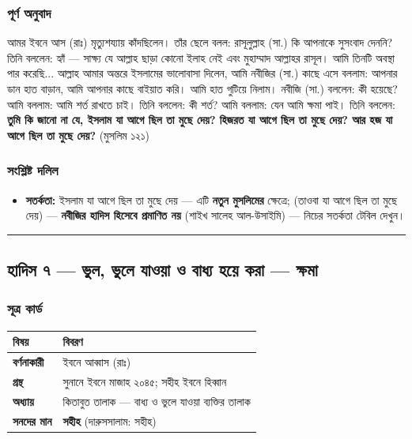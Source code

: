 \subsubsection*{পূর্ণ অনুবাদ}

আমর ইবনে আস (রাঃ) মৃত্যুশয্যায় কাঁদছিলেন। তাঁর ছেলে বলল: রাসূলুল্লাহ (সা.) কি আপনাকে সুসংবাদ দেননি? তিনি বললেন: হ্যাঁ — সাক্ষ্য যে আল্লাহ ছাড়া কোনো ইলাহ নেই এবং মুহাম্মাদ আল্লাহর রাসূল। আমি তিনটি অবস্থা পার করেছি... আল্লাহ আমার অন্তরে ইসলামের ভালোবাসা দিলেন, আমি নবীজির (সা.) কাছে এসে বললাম: আপনার ডান হাত বাড়ান, আমি আপনার কাছে বাইয়াত করি। আমি হাত গুটিয়ে নিলাম। নবীজি (সা.) বললেন: কী হয়েছে? আমি বললাম: আমি শর্ত রাখতে চাই। তিনি বললেন: কী শর্ত? আমি বললাম: যেন আমি ক্ষমা পাই। তিনি বললেন: \textbf{তুমি কি জানো না যে, ইসলাম যা আগে ছিল তা মুছে দেয়? হিজরত যা আগে ছিল তা মুছে দেয়? আর হজ যা আগে ছিল তা মুছে দেয়?} (মুসলিম ১২১)

\subsubsection*{সংশ্লিষ্ট দলিল}

\begin{itemize}
\item \textbf{সতর্কতা:} ইসলাম যা আগে ছিল তা মুছে দেয় — এটি \textbf{নতুন মুসলিমের} ক্ষেত্রে;     (তাওবা যা আগে ছিল তা মুছে দেয়) — \textbf{নবীজির হাদিস হিসেবে প্রমাণিত নয়} (শাইখ সালেহ আল-উসাইমি) — নিচের সতর্কতা টেবিল দেখুন।
\end{itemize}
\medskip\hrule\medskip

\subsection*{হাদিস ৭ — ভুল, ভুলে যাওয়া ও বাধ্য হয়ে করা — ক্ষমা}

\subsubsection*{সূত্র কার্ড}

\begin{table}[h]\centering\small
\begin{tabular}{ll}
বিষয় & বিবরণ \\
\hline
\textbf{বর্ণনাকারী} & ইবনে আব্বাস (রাঃ) \\
\textbf{গ্রন্থ} & সুনানে ইবনে মাজাহ ২০৪৫; সহীহ ইবনে হিব্বান \\
\textbf{অধ্যায়} & কিতাবুত তালাক — \lat{“}বাধ্য ও ভুলে যাওয়া ব্যক্তির তালাক\lat{”} \\
\textbf{সনদের মান} & \textbf{সহীহ} (দারুসসালাম: সহীহ) \\
\hline
\end{tabular}
\end{table}

